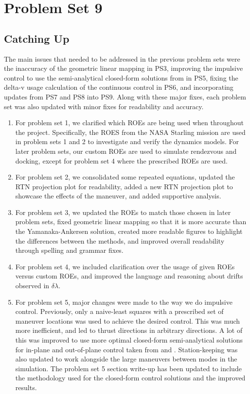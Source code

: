 \section{Problem Set 9}
\subsection{Catching Up}
The main issues that needed to be addressed in the previous problem sets were the inaccuracy of the geometric linear mapping in PS3, improving the impulsive control to use the semi-analytical closed-form solutions from \cite{chernick2018new} in PS5, fixing the delta-v usage calculation of the continuous control in PS6, and incorporating updates from PS7 and PS8 into PS9. Along with these major fixes, each problem set was also updated with minor fixes for readability and accuracy.
\begin{enumerate}
    \item For problem set 1, we clarified which ROEs are being used when throughout the project. Specifically, the ROES from the NASA Starling mission are used in problem sets 1 and 2 to investigate and verify the dynamics models. For later problem sets, our custom ROEs are used to simulate rendezvous and docking, except for problem set 4 where the prescribed ROEs are used.
    \item For problem set 2, we consolidated some repeated equations, updated the RTN projection plot for readability, added a new RTN projection plot to showcase the effects of the maneuver, and added supportive analysis.
    \item For problem set 3, we updated the ROEs to match those chosen in later problem sets, fixed geometric linear mapping so that it is more accurate than the Yamanaka-Ankersen solution, created more readable figures to highlight the differences between the methods, and  improved overall readability through spelling and grammar fixes.
    \item For problem set 4, we included clarification over the usage of given ROEs versus custom ROEs, and improved the language and reasoning about drifts observed in $\delta \lambda$.
    \item For problem set 5, major changes were made to the way we do impulsive control. Previously, only a naive-least squares with a prescribed set of maneuver locations was used to achieve the desired control. This was much more inefficient, and led to thrust directions in arbitrary directions. A lot of this was improved to use more optimal closed-form semi-analytical solutions for in-plane and out-of-plane control taken from \cite{damicothesis} and \cite{chernick2018new}. Station-keeping was also updated to work alongside the large maneuvers between modes in the simulation. The problem set 5 section write-up has been updated to include the methodology used for the closed-form control solutions and the improved results.

\end{enumerate}
